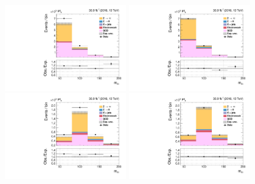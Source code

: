 \begin{figure}[h!]
\centering
  {\includegraphics[width=0.47\textwidth]{Figures/background_estimation/RQCDOSSS/Postfit/mt_ZeroJet2D_antiiso_near/prefit_mt_ZeroJet2D_antiiso_near.pdf}}
  {\includegraphics[width=0.47\textwidth]{Figures/background_estimation/RQCDOSSS/Postfit/mt_ZeroJet2D_antiiso_near/postfit_mt_ZeroJet2D_antiiso_near.pdf}} \\ 
  {\includegraphics[width=0.47\textwidth]{Figures/background_estimation/RQCDOSSS/Postfit/mt_Boosted2D_antiiso_near/prefit_mt_Boosted2D_antiiso_near.pdf}}
  {\includegraphics[width=0.47\textwidth]{Figures/background_estimation/RQCDOSSS/Postfit/mt_Boosted2D_antiiso_near/postfit_mt_Boosted2D_antiiso_near.pdf}} \\

\end{figure}
